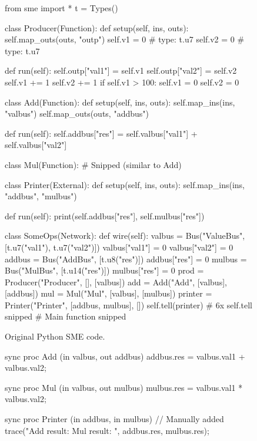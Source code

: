 \begin{widefigure}
  \begin{subfigure}[t]{0.49\textwidth}
  \begin{pythoncode}
from sme import *
t = Types()

class Producer(Function):
  def setup(self, ins, outs):
    self.map_outs(outs, "outp")
    self.v1 = 0  # type: t.u7
    self.v2 = 0  # type: t.u7

  def run(self):
    self.outp["val1"] = self.v1
    self.outp["val2"] = self.v2
    self.v1 += 1
    self.v2 += 1
    if self.v1 > 100:
      self.v1 = 0
      self.v2 = 0

class Add(Function):
  def setup(self, ins, outs):
    self.map_ins(ins, "valbus")
    self.map_outs(outs, "addbus")

  def run(self):
    self.addbus["res"] = self.valbus["val1"] +
             self.valbus["val2"]

class Mul(Function): # Snipped (similar to Add)

class Printer(External):
  def setup(self, ins, outs):
    self.map_ins(ins, "addbus", "mulbus")

  def run(self):
    print(self.addbus["res"],
          self.mulbus["res"])

class SomeOps(Network):
  def wire(self):
    valbus = Bus("ValueBus", [t.u7("val1"),
                              t.u7("val2")])
    valbus["val1"] = 0
    valbus["val2"] = 0
    addbus = Bus("AddBus", [t.u8("res")])
    addbus["res"] = 0
    mulbus = Bus("MulBus", [t.u14("res")])
    mulbus["res"] = 0
    prod = Producer("Producer", [], [valbus])
    add = Add("Add", [valbus], [addbus])
    mul = Mul("Mul", [valbus], [mulbus])
    printer = Printer("Printer",
                      [addbus, mulbus], [])
    self.tell(printer) # 6x self.tell snipped
# Main function snipped
\end{pythoncode}
\caption{Original Python SME code.}
\label{fig:someopspy}
\end{subfigure}
\begin{subfigure}[t]{0.49\textwidth}
  \begin{smeilcode}
sync proc Add (in valbus, out addbus)
{
    addbus.res = valbus.val1 + valbus.val2;
}

sync proc Mul (in valbus, out mulbus)
{
    mulbus.res = valbus.val1 * valbus.val2;
}

sync proc Printer (in addbus, in mulbus)
{
    // Manually added
    trace("Add result: {} Mul result: {}",
        addbus.res, mulbus.res);
}


\end{smeilcode}
\end{subfigure}
\end{widefigure}
